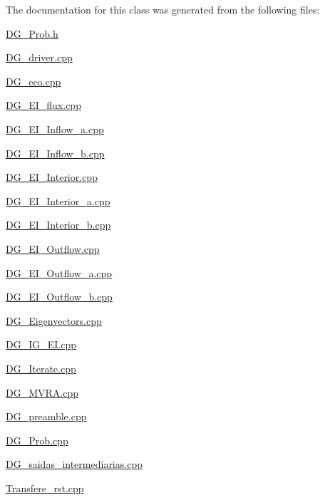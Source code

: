 The documentation for this class was generated from the following files\+:\begin{DoxyCompactItemize}
\item 
\hyperlink{DG__Prob_8h}{D\+G\+\_\+\+Prob.\+h}\item 
\hyperlink{DG__driver_8cpp}{D\+G\+\_\+driver.\+cpp}\item 
\hyperlink{DG__eco_8cpp}{D\+G\+\_\+eco.\+cpp}\item 
\hyperlink{DG__EI__flux_8cpp}{D\+G\+\_\+\+E\+I\+\_\+flux.\+cpp}\item 
\hyperlink{DG__EI__Inflow__a_8cpp}{D\+G\+\_\+\+E\+I\+\_\+\+Inflow\+\_\+a.\+cpp}\item 
\hyperlink{DG__EI__Inflow__b_8cpp}{D\+G\+\_\+\+E\+I\+\_\+\+Inflow\+\_\+b.\+cpp}\item 
\hyperlink{DG__EI__Interior_8cpp}{D\+G\+\_\+\+E\+I\+\_\+\+Interior.\+cpp}\item 
\hyperlink{DG__EI__Interior__a_8cpp}{D\+G\+\_\+\+E\+I\+\_\+\+Interior\+\_\+a.\+cpp}\item 
\hyperlink{DG__EI__Interior__b_8cpp}{D\+G\+\_\+\+E\+I\+\_\+\+Interior\+\_\+b.\+cpp}\item 
\hyperlink{DG__EI__Outflow_8cpp}{D\+G\+\_\+\+E\+I\+\_\+\+Outflow.\+cpp}\item 
\hyperlink{DG__EI__Outflow__a_8cpp}{D\+G\+\_\+\+E\+I\+\_\+\+Outflow\+\_\+a.\+cpp}\item 
\hyperlink{DG__EI__Outflow__b_8cpp}{D\+G\+\_\+\+E\+I\+\_\+\+Outflow\+\_\+b.\+cpp}\item 
\hyperlink{DG__Eigenvectors_8cpp}{D\+G\+\_\+\+Eigenvectors.\+cpp}\item 
\hyperlink{DG__IG__EI_8cpp}{D\+G\+\_\+\+I\+G\+\_\+\+E\+I.\+cpp}\item 
\hyperlink{DG__Iterate_8cpp}{D\+G\+\_\+\+Iterate.\+cpp}\item 
\hyperlink{DG__MVRA_8cpp}{D\+G\+\_\+\+M\+V\+R\+A.\+cpp}\item 
\hyperlink{DG__preamble_8cpp}{D\+G\+\_\+preamble.\+cpp}\item 
\hyperlink{DG__Prob_8cpp}{D\+G\+\_\+\+Prob.\+cpp}\item 
\hyperlink{DG__saidas__intermediarias_8cpp}{D\+G\+\_\+saidas\+\_\+intermediarias.\+cpp}\item 
\hyperlink{Transfere__rst_8cpp}{Transfere\+\_\+rst.\+cpp}\end{DoxyCompactItemize}
